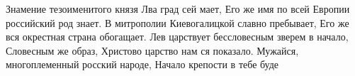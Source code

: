  
 
 
 
 


Знамение тезоименитого князя Лва град сей мает,
Его же имя по всей Европии российский род знает.
В митрополии Киевогалицкой славно пребывает,
Его же вся окрестная страна обогащает.
Лев царствует бессловесным зверем в начало,
Словесным же образ, Христово царство нам ся показало.
Мужайся, многоплеменный росский народе,
Начало крепости в тебе буде
